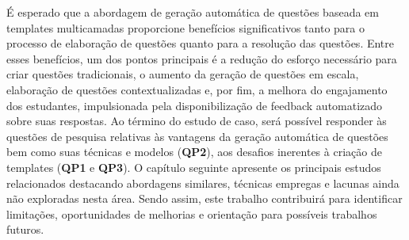 É esperado que a abordagem de geração automática de questões baseada em templates  multicamadas proporcione benefícios significativos tanto para o processo de elaboração de questões quanto para a resolução das questões. Entre esses benefícios,  um dos pontos principais é a redução do esforço necessário para criar questões tradicionais, o aumento da geração de questões em escala, elaboração de questões contextualizadas e, por fim, a melhora do engajamento dos estudantes, impulsionada pela disponibilização de feedback automatizado sobre suas respostas. Ao término do estudo de caso, será possível responder às questões de pesquisa relativas às vantagens da geração automática de questões bem como suas técnicas e modelos (\textbf{QP2}), aos desafios inerentes à criação de templates (\textbf{QP1} e \textbf{QP3}). O capítulo seguinte apresente os principais estudos relacionados destacando abordagens similares, técnicas empregas e lacunas ainda não exploradas nesta área. Sendo assim, este trabalho contribuirá para identificar limitações, oportunidades de melhorias e orientação para possíveis trabalhos futuros.


